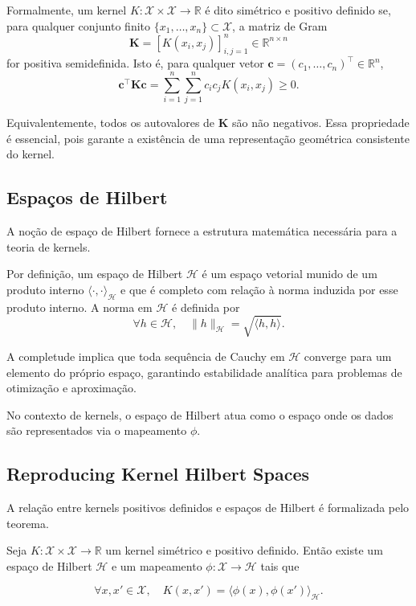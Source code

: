 Formalmente, um kernel $K: \mathcal{X} \times \mathcal{X} \to \mathbb{R}$ é dito simétrico e positivo
definido se, para qualquer conjunto finito $\{x_1, \ldots, x_n\} \subset \mathcal{X}$, a matriz de Gram
$$
\mathbf{K} = [K(x_i,x_j)]_{i,j=1}^n \in \mathbb{R}^{n \times n}
$$
for positiva semidefinida. Isto é, para qualquer vetor $\mathbf{c}=(c_1,\ldots,c_n)^\top \in \mathbb{R}^n$,
$$
\mathbf{c}^\top \mathbf{K}\mathbf{c}
=
\sum_{i=1}^n \sum_{j=1}^n c_i c_j K(x_i,x_j)
\geq 0.
$$

Equivalentemente, todos os autovalores de $\mathbf{K}$ são não negativos. Essa propriedade é essencial,
pois garante a existência de uma representação geométrica consistente do kernel.

\subsection{Espaços de Hilbert}

A noção de espaço de Hilbert fornece a estrutura matemática necessária para a teoria de kernels.

Por definição, um espaço de Hilbert $\mathcal{H}$ é um espaço vetorial munido de um produto interno
$\langle \cdot, \cdot \rangle_{\mathcal{H}}$ e que é completo com relação à norma induzida por esse produto interno. A norma em $\mathcal{H}$ é definida por
$$
\forall h \in \mathcal{H}, \quad \|h\|_{\mathcal{H}} = \sqrt{\langle h,h\rangle}.
$$

A completude implica que toda sequência de Cauchy em $\mathcal{H}$ converge para um elemento do próprio
espaço, garantindo estabilidade analítica para problemas de otimização e aproximação.

No contexto de kernels, o espaço de Hilbert atua como o espaço onde os dados são representados via o
mapeamento $\phi$.

\subsection{Reproducing Kernel Hilbert Spaces}

A relação entre kernels positivos definidos e espaços de Hilbert é formalizada pelo teorema.

Seja $K: \mathcal{X} \times \mathcal{X} \to \mathbb{R}$ um kernel simétrico e positivo definido. Então existe um espaço de Hilbert $\mathcal{H}$ e um mapeamento $\phi: \mathcal{X} \to \mathcal{H}$ tais que

$$
\forall x,x' \in \mathcal{X}, \quad K(x,x') = \langle \phi(x), \phi(x') \rangle_{\mathcal{H}}.
$$

